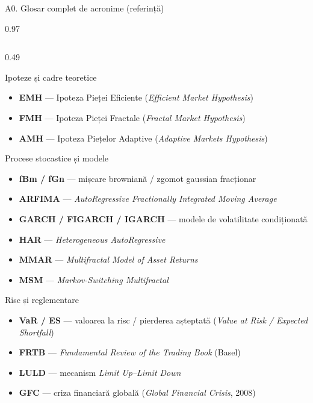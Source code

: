 \documentclass[9pt, aspectratio=169, t]{beamer}
\begin{document}
\begin{frame}[shrink=35]{A0. Glosar complet de acronime (referință)}
\begin{cminipage}{0.97\textwidth}
\begin{columns}[T]
\begin{column}{0.49\textwidth}
\begin{block}{Ipoteze și cadre teoretice}
\begin{itemize}\setlength{\itemsep}{0pt}
    \item \textbf{EMH} --- Ipoteza Pieței Eficiente (\textit{Efficient Market Hypothesis})
    \item \textbf{FMH} --- Ipoteza Pieței Fractale (\textit{Fractal Market Hypothesis})
    \item \textbf{AMH} --- Ipoteza Piețelor Adaptive (\textit{Adaptive Markets Hypothesis})
\end{itemize}
\end{block}
\begin{block}{Procese stocastice și modele}
\begin{itemize}\setlength{\itemsep}{0pt}
    \item \textbf{fBm / fGn} --- mișcare browniană / zgomot gaussian fracționar
    \item \textbf{ARFIMA} --- \textit{AutoRegressive Fractionally Integrated Moving Average}
    \item \textbf{GARCH / FIGARCH / IGARCH} --- modele de volatilitate condiționată
    \item \textbf{HAR} --- \textit{Heterogeneous AutoRegressive}
    \item \textbf{MMAR} --- \textit{Multifractal Model of Asset Returns}
    \item \textbf{MSM} --- \textit{Markov-Switching Multifractal}
\end{itemize}
\end{block}
\begin{block}{Risc și reglementare}
\begin{itemize}\setlength{\itemsep}{0pt}
    \item \textbf{VaR / ES} --- valoarea la risc / pierderea așteptată (\textit{Value at Risk / Expected Shortfall})
    \item \textbf{FRTB} --- \textit{Fundamental Review of the Trading Book} (Basel)
    \item \textbf{LULD} --- mecanism \textit{Limit Up--Limit Down}
    \item \textbf{GFC} --- criza financiară globală (\textit{Global Financial Crisis}, 2008)

\end{itemize}
\end{block}
\end{column}
\end{columns}
\end{cminipage}
\end{frame}
\end{document}
